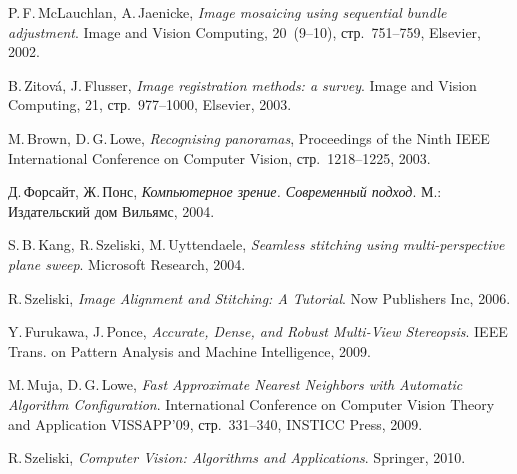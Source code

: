 \documentclass[a4paper,12pt]{article}
\begin{document}
\begin{thebibliography}{99}
  P.\,F.\,McLauchlan, A.\,Jaenicke,
  \emph{Image mosaicing using sequential bundle adjustment}.
  Image and Vision Computing,
  20~(9--10),
  стр.~751--759,
  Elsevier,
  2002.

  B.\,Zitov\'a, J.\,Flusser,
  \emph{Image registration methods: a survey}.
  Image and Vision Computing,
  21,
  стр.~977--1000,
  Elsevier,
  2003.
  
  M.\,Brown, D.\,G.\,Lowe,
  \emph{Recognising panoramas},
  Proceedings of the Ninth IEEE International Conference on Computer Vision,
  стр.~1218--1225,
  2003.

  Д.\,Форсайт, Ж.\,Понс,
  \emph{Компьютерное зрение. Современный подход}.
  М.: Издательский дом {\guillemotleft}Вильямс{\guillemotright},
  2004.

  S.\,B.\,Kang, R.\,Szeliski, M.\,Uyttendaele,
  \emph{Seamless stitching using multi-perspective plane sweep}.
  Microsoft Research,
  2004.

  R.\,Szeliski,
  \emph{Image Alignment and Stitching: A Tutorial}.
  Now Publishers Inc,
  2006.
 
  Y.\,Furukawa, J.\,Ponce,
  \emph{Accurate, Dense, and Robust Multi-View Stereopsis}.
  IEEE Trans. on Pattern Analysis and Machine Intelligence,
  2009.
 
  M.\,Muja, D.\,G.\,Lowe,
  \emph{Fast Approximate Nearest Neighbors with Automatic Algorithm Configuration}.
  International Conference on Computer Vision Theory and Application VISSAPP'09,
  стр.~331--340,
  INSTICC Press,
  2009.

  R.\,Szeliski,
  \emph{Computer Vision: Algorithms and Applications}.
  Springer,
  2010.

\end{thebibliography}

\begin{comment}
\begin{flushright}
\begin{spacing}{1.5}
\begin{tabular}{l l l}
Студент & \noindent\underline{\makebox[2.5cm][l]{}} & В.\,В.\,Руцкий \\
Руководитель & \noindent\underline{\makebox[2.5cm][l]{}} & А.\,С.\,Ковалёв\\
\end{tabular}
\vspace{1cm}

\today
\end{spacing}
\end{flushright}
\end{comment}
\end{document}
